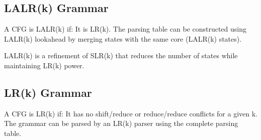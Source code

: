 \subsection{LALR(k) Grammar}
A CFG is LALR(k) if:
It is LR(k).
The parsing table can be constructed using LALR(k) lookahead by merging states with the same core (LALR(k) states).

LALR(k) is a refinement of SLR(k) that reduces the number of states while maintaining LR(k) power.

\subsection{LR(k) Grammar}
A CFG is LR(k) if:
It has no shift/reduce or reduce/reduce conflicts for a given k.
The grammar can be parsed by an LR(k) parser using the complete parsing table.
